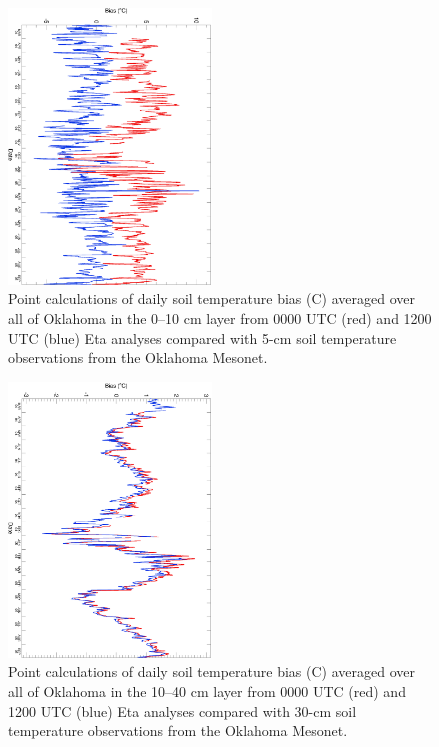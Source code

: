 \documentclass[twocolumn]{article}
\begin{document}
\subsection{}
\label{etacomp_temp.sub}
\begin{figure}[!t] %
\begin{center}
\includegraphics[angle=90, width=0.48\textwidth]{etacompfig3col}
\end{center}
\caption{
Point calculations of daily soil temperature bias (\textdegree{}C) averaged over all of Oklahoma in the 0--10 cm layer
from 0000 UTC (red) and 1200 UTC (blue) Eta analyses compared with 5-cm
soil temperature observations from the Oklahoma Mesonet.
\label{etacompfig3}
}
\end{figure}
\begin{figure}[!t] %
\begin{center}
\includegraphics[angle=90, width=0.48\textwidth]{etacompfig4col}
\end{center}
\caption{
Point calculations of daily soil temperature bias (\textdegree{}C) averaged over all of Oklahoma in the 10--40 cm layer
from 0000 UTC (red) and 1200 UTC (blue) Eta analyses compared with 30-cm
soil temperature observations from the Oklahoma Mesonet.
\label{etacompfig4}
}
\end{figure}
\end{document}
